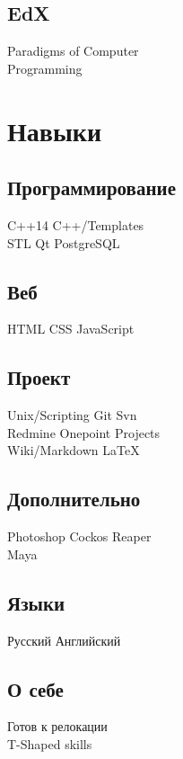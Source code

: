 \documentclass[a4paper]{curricula-vitae}
\begin{document}
\begin{minipage}[t]{0.33\textwidth}
\insertspace

\subsection{EdX}
Paradigms of Computer \\
Programming

\insertspace

\section{Навыки}

\subsection{Программирование}
C++14 \textbullet{} C++/Templates \\
STL \textbullet{} Qt \textbullet{} PostgreSQL


\insertspace

\subsection{Веб}
HTML \textbullet{} CSS \textbullet{} JavaScript

\insertspace

\subsection{Проект}
Unix/Scripting \textbullet{} Git \textbullet{} Svn \\
Redmine \textbullet{} Onepoint Projects \\
Wiki/Markdown \textbullet{} \LaTeX

\insertspace

\subsection{Дополнительно}
Photoshop \textbullet{} Cockos Reaper \\
Maya

\insertspace

\subsection{Языки}
Русский \textbullet{} Английский

\insertspace

\subsection{О себе}
Готов к релокации \\
T-Shaped skills

\insertspace

\end{minipage} %
\end{document}
